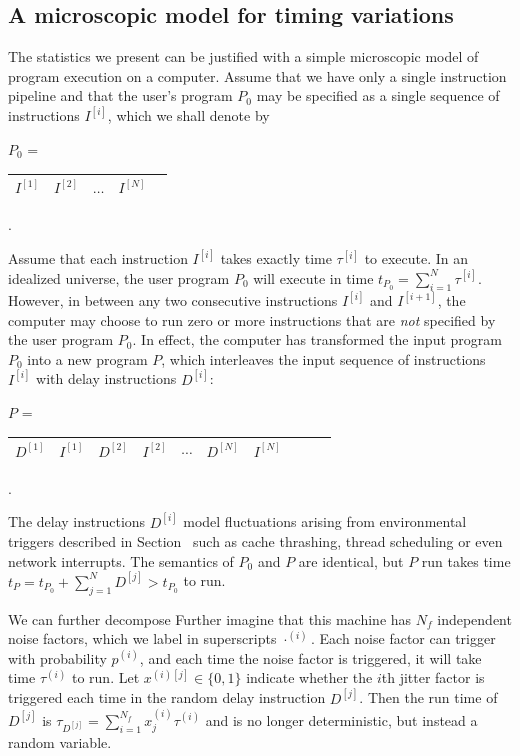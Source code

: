 \documentclass[conference]{IEEEtran}
\begin{document}
\label{sec:statmodel}
\subsection{A microscopic model for timing variations}

The statistics we present can be justified with a simple microscopic
model of program execution on a computer.
Assume that we have only a single instruction pipeline
and that the user's program $P_0$ may be specified as a single sequence of instructions
$I^{[i]}$, which we shall denote by

$P_0$ = \begin{tabular}{|c|c|c|c|c|}
\hline
$I^{[1]}$ & $I^{[2]}$ & $\dots$ & $I^{[N]}$ \tabularnewline
\hline
\end{tabular}.

Assume that each instruction $I^{[i]}$ takes exactly time $\tau^{[i]}$ to execute.
In an idealized universe, the user program $P_0$ will execute in time
$t_{P_0} = \sum_{i=1}^N \tau^{[i]}$.
However, in between any two consecutive instructions $I^{[i]}$ and $I^{[i+1]}$,
the computer may choose to run zero or more instructions that are \textit{not}
specified by the user program $P_0$. In effect, the computer has transformed the
input program $P_0$ into a new program $P$, which interleaves the input sequence
of instructions $I^{[i]}$ with delay instructions $D^{[i]}$:

$P$ = \begin{tabular}{|c|c|c|c|c|c|c|c|c|c|}
\hline
$D^{[1]}$ & $I^{[1]}$ & $D^{[2]}$ & $I^{[2]}$ &
$\cdots$ & $D^{[N]}$ & $I^{[N]}$
\tabularnewline
\hline
\end{tabular}.

The delay instructions $D^{[i]}$ model fluctuations arising from environmental
triggers described in Section~\label{ref:intro} such as cache thrashing, thread
scheduling or even network interrupts. The semantics of $P_0$ and $P$ are
identical, but $P$ run takes time $t_P = t_{P_0} + \sum_{j=1}^N D^{[j]} > t_{P_0}$
to run.

We can further decompose
Further imagine that this machine has $N_f$ independent noise factors, which we label in superscripts $\cdot^{(i)}$. Each noise factor can trigger with probability $p^{(i)}$, and each time the noise factor is triggered, it will take time $\tau^{(i)}$ to run. Let $x^{(i)[j]} \in \{0, 1\}$ indicate whether the $i$th jitter factor is triggered each time in the random delay instruction $D^{[j]}$. Then the run time of $D^{[j]}$ is
$\tau_{D^{[j]}} = \sum_{i=1}^{N_f} x^{(i)}_j \tau^{(i)}$ and is no longer deterministic, but instead a random variable.
\end{document}
